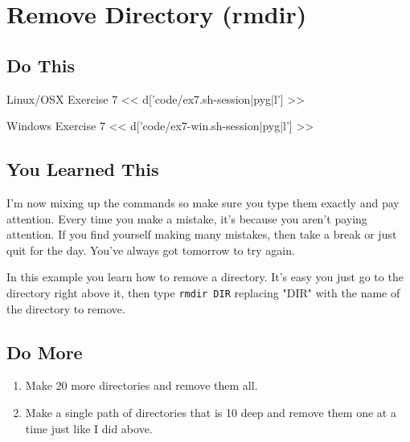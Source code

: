 \chapter{Remove Directory (rmdir)}

\section{Do This}

\begin{code}{Linux/OSX Exercise 7}
<< d['code/ex7.sh-session|pyg|l'] >>
\end{code}

\begin{code}{Windows Exercise 7}
<< d['code/ex7-win.sh-session|pyg|l'] >>
\end{code}

\section{You Learned This}

I'm now mixing up the commands so make sure you type them exactly and pay attention.
Every time you make a mistake, it's because you aren't paying attention.  If you
find yourself making many mistakes, then take a break or just quit for the day.
You've always got tomorrow to try again.

In this example you learn how to remove a directory.  It's easy you just
go to the directory right above it, then type \verb|rmdir DIR| replacing "DIR"
with the name of the directory to remove.

\section{Do More}

\begin{enumerate}
\item Make 20 more directories and remove them all.
\item Make a single path of directories that is 10 deep and remove them one at a
    time just like I did above.
\end{enumerate}

